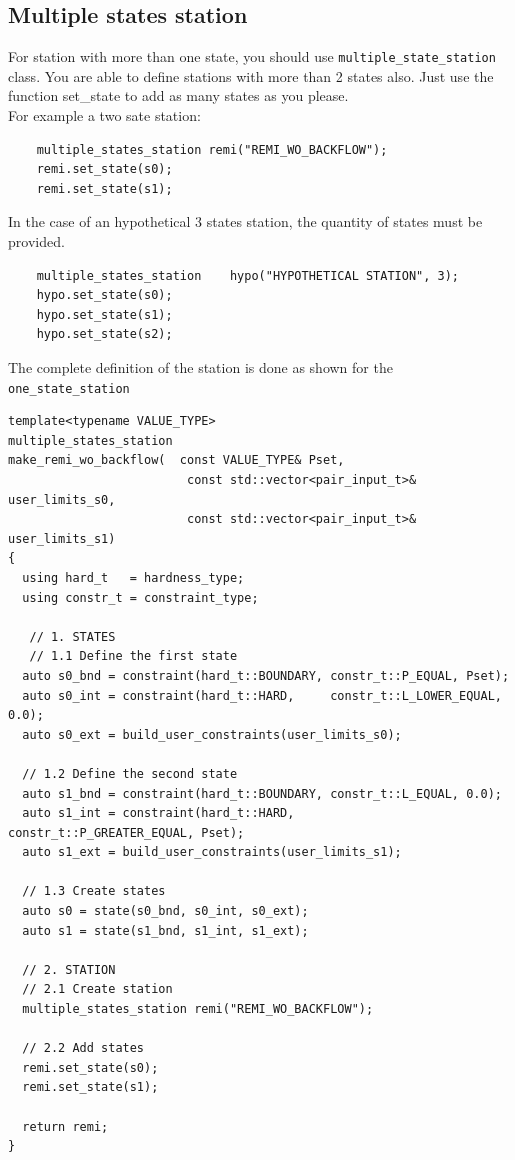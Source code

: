 \subsection{Multiple states station}  
        
For station with more than one state, you should use \texttt{multiple\_state\_station} class. 
You are able to define stations with more than 2 states also. Just use  the function {set\_state} to add as many states as you please. \\
    
For example a two sate station: 
\begin{verbatim}
    multiple_states_station remi("REMI_WO_BACKFLOW");
    remi.set_state(s0);
    remi.set_state(s1);
\end{verbatim}
In the case of an hypothetical 3 states station, the quantity of states must be provided.

\begin{verbatim}
    multiple_states_station    hypo("HYPOTHETICAL STATION", 3);
    hypo.set_state(s0);
    hypo.set_state(s1);        
    hypo.set_state(s2);              
\end{verbatim}    
The complete definition of the station is done as shown for the \texttt{one\_state\_station}            
                 
\begin{verbatim}
template<typename VALUE_TYPE>
multiple_states_station
make_remi_wo_backflow(  const VALUE_TYPE& Pset,
                         const std::vector<pair_input_t>& user_limits_s0,
                         const std::vector<pair_input_t>& user_limits_s1)
{
  using hard_t   = hardness_type;
  using constr_t = constraint_type;
  
   // 1. STATES
   // 1.1 Define the first state
  auto s0_bnd = constraint(hard_t::BOUNDARY, constr_t::P_EQUAL, Pset);
  auto s0_int = constraint(hard_t::HARD,     constr_t::L_LOWER_EQUAL, 0.0); 
  auto s0_ext = build_user_constraints(user_limits_s0);
 
  // 1.2 Define the second state
  auto s1_bnd = constraint(hard_t::BOUNDARY, constr_t::L_EQUAL, 0.0); 
  auto s1_int = constraint(hard_t::HARD,     constr_t::P_GREATER_EQUAL, Pset);
  auto s1_ext = build_user_constraints(user_limits_s1);

  // 1.3 Create states
  auto s0 = state(s0_bnd, s0_int, s0_ext);
  auto s1 = state(s1_bnd, s1_int, s1_ext);
 
  // 2. STATION
  // 2.1 Create station    
  multiple_states_station remi("REMI_WO_BACKFLOW");
  
  // 2.2 Add states
  remi.set_state(s0);
  remi.set_state(s1);

  return remi;
}
\end{verbatim}

